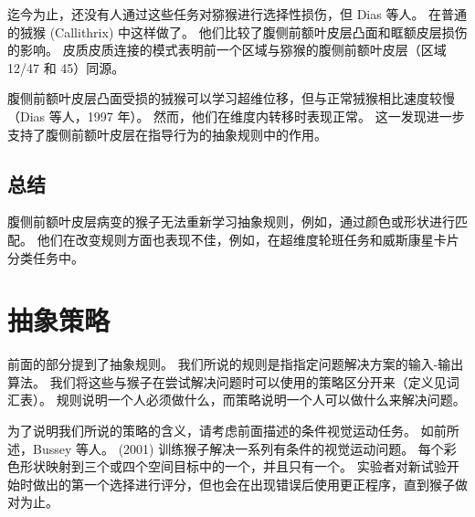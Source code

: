 迄今为止，还没有人通过这些任务对猕猴进行选择性损伤，但 Dias 等人。
\cite{dias1997dissociable}在普通的狨猴 (Callithrix) 中这样做了。 
他们比较了腹侧前额叶皮层凸面和眶额皮层损伤的影响。 
皮质皮质连接的模式表明前一个区域与猕猴的腹侧前额叶皮层（区域 12/47 和 45）同源\cite{roberts2007forebrain}。
\par


腹侧前额叶皮层凸面受损的狨猴可以学习超维位移，但与正常狨猴相比速度较慢（Dias 等人，1997 年）。 
然而，他们在维度内转移时表现正常。 
这一发现进一步支持了腹侧前额叶皮层在指导行为的抽象规则中的作用。



\subsection{总结}
\par

腹侧前额叶皮层病变的猴子无法重新学习抽象规则，例如，通过颜色或形状进行匹配。 
他们在改变规则方面也表现不佳，例如，在超维度轮班任务和威斯康星卡片分类任务中。



\section{抽象策略}
\par 
前面的部分提到了抽象规则。
我们所说的规则是指指定问题解决方案的输入-输出算法。 
我们将这些与猴子在尝试解决问题时可以使用的策略区分开来（定义见词汇表）。 
规则说明一个人必须做什么，而策略说明一个人可以做什么来解决问题。
\par 


为了说明我们所说的策略的含义，请考虑前面描述的条件视觉运动任务。 
如前所述，Bussey 等人。 
(2001) 训练猴子解决一系列有条件的视觉运动问题。 
每个彩色形状映射到三个或四个空间目标中的一个，并且只有一个。 
实验者对新试验开始时做出的第一个选择进行评分，但也会在出现错误后使用更正程序，直到猴子做对为止。


